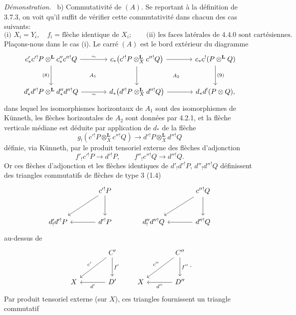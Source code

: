 \documentclass[11pt]{article}
\newenvironment{prooftext}[1][Proof]{\par\noindent\emph{#1.}\ }{\par\medskip}
\begin{document}
\begin{prooftext}[Démonstration]
b) Commutativité de $(A)$. Se reportant à la définition de 3.7.3, on voit qu'il suffit de vérifier cette commutativité dans chacun des cas suivants:
\[
\text{(i) } X_i=Y_i,\quad f_i=\text{flèche identique de }X_i;\qquad
\text{(ii) les faces latérales de 4.4.0 sont cartésiennes.}
\]
Plaçons-nous dans le cas (i). Le carré $(A)$ est le bord extérieur du diagramme
\[
\begin{tikzcd}[column sep=large,row sep=large]
c'_*c'{}^!P\otimes^{\mathbf L}c''_*c''{}^!Q
 \arrow[r,"\sim"] \arrow[d,"(8)"'] &
c_*\bigl(c'{}^!P\otimes_X^{\mathbf L}c''{}^!Q\bigr)
 \arrow[r] \arrow[d] &
c_*c^!(P\otimes^{\mathbf L} Q)\arrow[d,"(9)"]\\
d'_*d'{}^!P\otimes^{\mathbf L}d''_*d''{}^!Q
 \arrow[r,"\sim"'] &
d_*\bigl(d'{}^!P\otimes_X^{\mathbf L}d''{}^!Q\bigr)
 \arrow[r] &
d_*d^!(P\otimes Q),
\arrow[from=1-1,to=2-2, phantom, "\scriptstyle A_1"]
\arrow[from=1-2,to=2-3, phantom, "\scriptstyle A_2"]
\end{tikzcd}
\]
dans lequel les isomorphismes horizontaux de $A_1$ sont des isomorphismes de Künneth, les flèches horizontales de $A_2$ sont données par 4.2.1, et la flèche verticale médiane est déduite par application de $d_*$ de la flèche
\[
g_!(c'{}^!P\otimes_X^{\mathbf L}c''{}^!Q)\longrightarrow d'{}^!P\otimes_X^{\mathbf L}d''{}^!Q
\]
définie, via Künneth, par le produit tensoriel externe des flèches d'adjonction
\[
f'_!c'{}^!P\longrightarrow d'{}^!P,\qquad
f''_!c''{}^!Q\longrightarrow d''{}^!Q.
\]
Or ces flèches d'adjonction et les flèches identiques de $d'_!d'{}^!P$, $d''_!d''{}^!Q$ définissent des triangles commutatifs de flèches de type $3$ (1.4)
\[
\begin{tikzcd}[column sep=large,row sep=large]
& c'{}^!P \arrow[d] \arrow[dl] & & c''{}^!Q \arrow[d]\arrow[dl]\\
d'_!d'{}^!P & d'{}^!P\arrow[l] & d''_!d''{}^!Q & d''{}^!Q\arrow[l]
\end{tikzcd}
\]
au-dessus de
\[
\begin{tikzcd}[column sep=large,row sep=large]
& C' \arrow[d,"f'"] \arrow[dl,"c'"']\\
X & D'\arrow[l,"d'"]
\end{tikzcd}
\qquad
\begin{tikzcd}[column sep=large,row sep=large]
& C'' \arrow[d,"f''"] \arrow[dl,"c''"']\\
X & D''\arrow[l,"d''"]
\end{tikzcd}.
\]
Par produit tensoriel externe (sur $X$), ces triangles fournissent un triangle commutatif
\[
\begin{tikzcd}[column sep=huge,row sep=large]

\end{tikzcd}\]
\end{prooftext}
\end{document}
